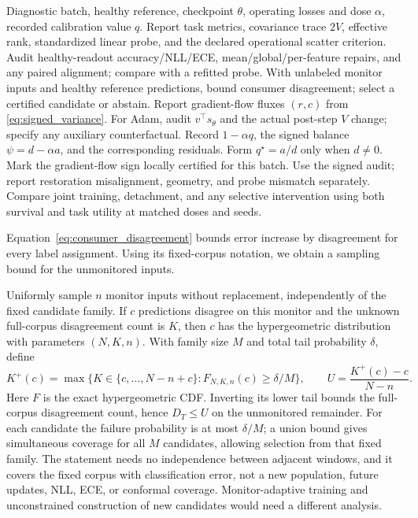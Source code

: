 \documentclass{article}
\begin{document}
\begin{algorithm}[t]
\caption{Auditing representation survival and probe validity}\label{alg:survival_audit}
\begin{algorithmic}[1]
\REQUIRE Diagnostic batch, healthy reference, checkpoint $\theta$, operating losses and dose $\alpha$, recorded calibration value $q$.
\STATE Report task metrics, covariance trace $2V$, effective rank, standardized linear probe, and the declared operational scatter criterion.
\STATE Audit healthy-readout accuracy/NLL/ECE, mean/global/per-feature repairs, and any paired alignment; compare with a refitted probe.
\STATE With unlabeled monitor inputs and healthy reference predictions, bound consumer disagreement; select a certified candidate or abstain.
\STATE Report gradient-flow fluxes $(r,c)$ from \eqref{eq:signed_variance}. For Adam, audit $v^\top s_\theta$ and the actual post-step $V$ change; specify any auxiliary counterfactual.
\STATE Record $1-\alpha q$, the signed balance $\psi=d-\alpha a$, and the corresponding residuals. Form $q^\star=a/d$ only when $d\ne0$.
\STATE Mark the gradient-flow sign locally certified for this batch.
\ELSE
\STATE Use the signed audit; report restoration misalignment, geometry, and probe mismatch separately.
\ENDIF
\STATE Compare joint training, detachment, and any selective intervention using both survival and task utility at matched doses and seeds.
\end{algorithmic}
\end{algorithm}

Equation~\eqref{eq:consumer_disagreement} bounds error increase by
disagreement for every label assignment. Using its fixed-corpus notation,
we obtain a sampling bound for the unmonitored inputs.

Uniformly sample $n$ monitor inputs without replacement, independently of the fixed candidate family. If $c$ predictions disagree on this monitor and the unknown full-corpus disagreement count is $K$, then $c$ has the hypergeometric distribution with parameters $(N,K,n)$. With family size $M$ and total tail probability $\delta$, define
\begin{equation}
 K^+(c)=\max\{K\in\{c,\ldots,N-n+c\}:F_{N,K,n}(c)\ge\delta/M\},\qquad
 U=\frac{K^+(c)-c}{N-n}.
 \label{eq:consumer_finite}
\end{equation}
Here $F$ is the exact hypergeometric CDF. Inverting its lower tail bounds the full-corpus disagreement count, hence $D_T\le U$ on the unmonitored remainder. For each candidate the failure probability is at most $\delta/M$; a union bound gives simultaneous coverage for all $M$ candidates, allowing selection from that fixed family. The statement needs no independence between adjacent windows, and it covers the fixed corpus with classification error, not a new population, future updates, NLL, ECE, or conformal coverage. Monitor-adaptive training and unconstrained construction of new candidates would need a different analysis.
\end{document}

